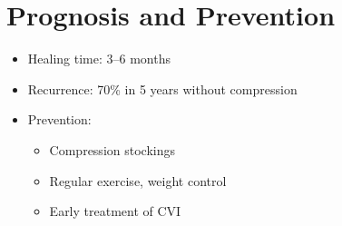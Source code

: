\documentclass{article}
\begin{document}
\section*{Prognosis and Prevention}
\begin{itemize}[noitemsep]
    \item Healing time: 3–6 months
    \item Recurrence: 70\% in 5 years without compression
    \item Prevention:
    \begin{itemize}
        \item Compression stockings
        \item Regular exercise, weight control
        \item Early treatment of CVI
    \end{itemize}
\end{itemize}
\end{document}
